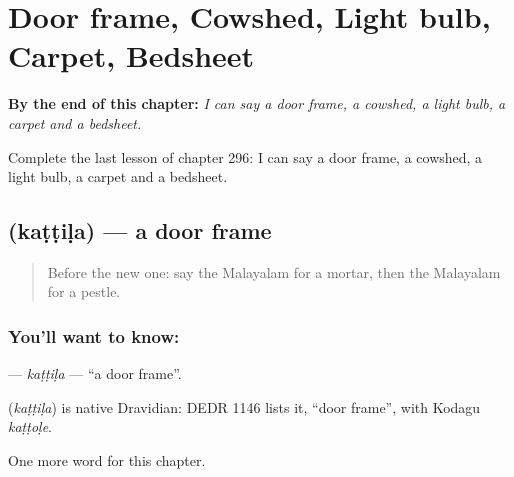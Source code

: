 
\chapter{Door frame, Cowshed, Light bulb, Carpet, Bedsheet}
\label{ch:ml-door-frame-cowshed-light-bulb-carpet-bedsheet}

\begin{chapteropening}
\textbf{By the end of this chapter:} \emph{I can say a door frame, a cowshed, a light bulb, a carpet and a bedsheet.}

Complete the last lesson of chapter 296: I can say a door frame, a cowshed, a light bulb, a carpet and a bedsheet.
\end{chapteropening}

\section[\texorpdfstring{\ml{കട്ടിള} (kaṭṭiḷa)}{കട്ടിള (kaṭṭiḷa)}]{ (kaṭṭiḷa) — a door frame}

\label{lesson:ML-C296-kattila}



\begin{quote}
Before the new one: say the Malayalam for a mortar, then the Malayalam for a pestle.
\end{quote}

\subsection*{You'll want to know: }
\textbf{} — \emph{kaṭṭiḷa} — \textquotedblleft{}a door frame\textquotedblright{}.

\begin{cousinweb}
\textbf{} (\emph{kaṭṭiḷa}) is native Dravidian: DEDR 1146 lists it, \textquotedblleft{}door frame\textquotedblright{}, with Kodagu \emph{kaṭṭoḷe}.
\end{cousinweb}

\begin{grammarlens}[title={What you've built}]
One more word for this chapter.
\end{grammarlens}


